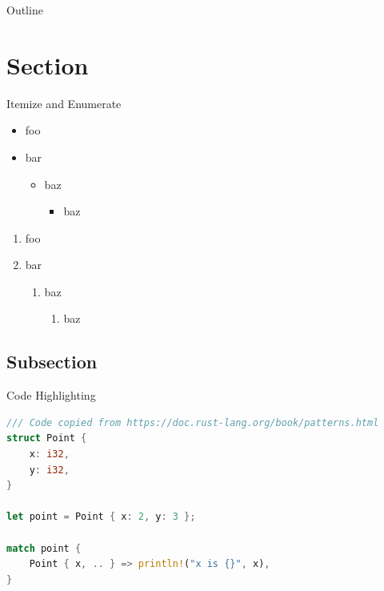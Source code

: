 
\begin{frame}[plain]
  \titlepage
\end{frame}

\begin{frame}{Outline}
\tableofcontents
\end{frame}

\section{Section}


\begin{frame}{Itemize and Enumerate}
    \begin{itemize}
      \item foo
      \item bar
        \begin{itemize}
          \item baz
            \begin{itemize}
              \item baz
            \end{itemize}
        \end{itemize}
    \end{itemize}
    \begin{enumerate}
      \item foo
      \item bar
        \begin{enumerate}
          \item baz
            \begin{enumerate}
              \item baz
            \end{enumerate}
        \end{enumerate}
    \end{enumerate}
\end{frame}

\subsection{Subsection}
\begin{frame}[fragile]{Code Highlighting}
  \begin{lstlisting}[language=Rust]
/// Code copied from https://doc.rust-lang.org/book/patterns.html
struct Point {
    x: i32,
    y: i32,
}

let point = Point { x: 2, y: 3 };

match point {
    Point { x, .. } => println!("x is {}", x),
}
  \end{lstlisting}
\end{frame}


